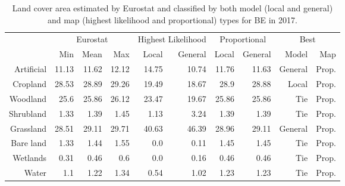 \begin{table}[H]
\centering
\caption{Land cover area estimated by Eurostat and classified by both model (local and general) and map (highest likelihood and proportional) types for BE in 2017.}

\begin{tabular}{r|rrr|rr|rr|rr}
\toprule
{} & \multicolumn{3}{|c}{Eurostat} & \multicolumn{2}{|c}{Highest Likelihood} & \multicolumn{2}{|c}{Proportional} & \multicolumn{2}{|c}{Best} \\
{} &      Min &   Mean &    Max &              Local & General &        Local & General &    Model &    Map \\
\midrule
Artificial &    11.13 &  11.62 &  12.12 &              14.75 &   10.74 &        11.76 &   11.63 &  General &  Prop. \\
Cropland   &    28.53 &  28.89 &  29.26 &              19.49 &   18.67 &         28.9 &   28.88 &    Local &  Prop. \\
Woodland   &     25.6 &  25.86 &  26.12 &              23.47 &   19.67 &        25.86 &   25.86 &      Tie &  Prop. \\
Shrubland  &     1.33 &   1.39 &   1.45 &               1.13 &    3.24 &         1.39 &    1.39 &      Tie &  Prop. \\
Grassland  &    28.51 &  29.11 &  29.71 &              40.63 &   46.39 &        28.96 &   29.11 &  General &  Prop. \\
Bare land  &     1.33 &   1.44 &   1.55 &                0.0 &    0.11 &         1.45 &    1.45 &      Tie &  Prop. \\
Wetlands   &     0.31 &   0.46 &    0.6 &                0.0 &    0.16 &         0.46 &    0.46 &      Tie &  Prop. \\
Water      &      1.1 &   1.22 &   1.34 &               0.54 &    1.02 &         1.23 &    1.23 &      Tie &  Prop. \\
\bottomrule
\end{tabular}
\end{table}

